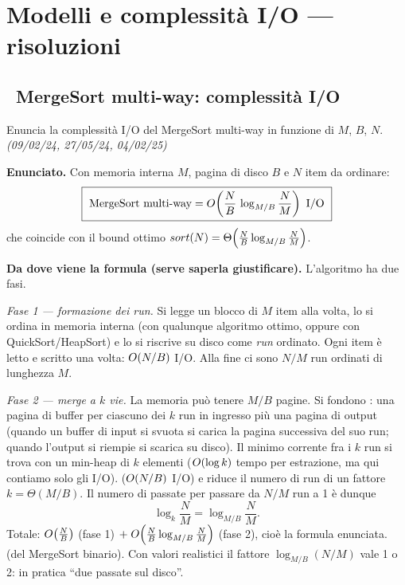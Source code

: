 \section{Modelli e complessit\`a I/O --- risoluzioni}

\subsection*{\hot\ MergeSort multi-way: complessit\`a I/O}

\begin{domanda}
Enuncia la complessit\`a I/O del MergeSort multi-way in funzione di $M$, $B$, $N$.
\emph{(09/02/24, 27/05/24, 04/02/25)}
\end{domanda}

\textbf{Enunciato.} Con memoria interna $M$, pagina di disco $B$ e $N$ item da ordinare:
\[
\boxed{\ \text{MergeSort multi-way} = \OO{\frac{N}{B}\,\log_{M/B}\frac{N}{M}} \text{ I/O}\ }
\]
che coincide con il bound ottimo $sort(N)=\Theta\!\left(\frac{N}{B}\log_{M/B}\frac{N}{M}\right)$.

\textbf{Da dove viene la formula (serve saperla giustificare).} L'algoritmo ha due fasi.

\emph{Fase 1 --- formazione dei run.} Si legge un blocco di $M$ item alla volta, lo si ordina in
memoria interna (con qualunque algoritmo ottimo, oppure con QuickSort/HeapSort) e lo si riscrive su
disco come \emph{run} ordinato. Ogni item \`e letto e scritto una volta: $O\!\left(N/B\right)$ I/O. Alla fine
ci sono $N/M$ run ordinati di lunghezza $M$.

\emph{Fase 2 --- merge a $k$ vie.} La memoria pu\`o tenere $M/B$ pagine. Si fondono
: una pagina di buffer per ciascuno dei $k$ run in ingresso
pi\`u una pagina di output (quando un buffer di input si svuota si carica la pagina successiva del
suo run; quando l'output si riempie si scarica su disco). Il minimo corrente fra i $k$ run si trova
con un min-heap di $k$ elementi ($O\!\left(\log k\right)$ tempo per estrazione, ma qui contiamo solo gli I/O).
 ($O\!\left(N/B\right)$ I/O) e riduce il numero di
run di un fattore $k=\Theta(M/B)$. Il numero di passate per passare da $N/M$ run a 1 \`e dunque
\[
\log_k\frac{N}{M}=\log_{M/B}\frac{N}{M}.
\]
Totale: $O\!\left(\frac{N}{B}\right)$ (fase 1) $+\;O\!\left(\frac{N}{B}\log_{M/B}\frac{N}{M}\right)$ (fase 2), cio\`e la
formula enunciata.  (del
MergeSort binario). Con valori realistici il fattore $\log_{M/B}(N/M)$ vale 1 o 2: in pratica
``due passate sul disco''.

